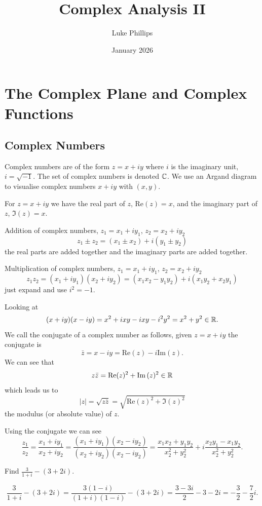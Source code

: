 \documentclass[10pt, a4paper]{article}
\title{Complex Analysis II}
\author{Luke Phillips}
\date{January 2026}
\begin{document}
\maketitle

\newpage

\tableofcontents

\newpage

\section{The Complex Plane and Complex Functions}

\subsection{Complex Numbers}

Complex numbers are of the form $z = x + iy$ where $i$ is the imaginary unit,
$i = \sqrt{-1}$.
The set of complex numbers is denoted $\mathbb{C}$.
We use an Argand diagram to visualise complex numbers $x + iy$ with $(x, y)$.

For $z = x + iy$ we have the real part of $z$,
$\mathrm{Re}(z) = x$,
and the imaginary part of $z$,
$\Im(z) = x$.

Addition of complex numbers,
$z_1 = x_1 + iy_1$,
$z_2 = x_2 + iy_2$
\[
z_1 \pm z_2 = (x_1 \pm x_2) + i(y_1 \pm y_2)
\]
the real parts are added together and the imaginary parts are added together.

Multiplication of complex numbers,
$z_1 = x_1 + iy_1$,
$z_2 = x_2 + iy_2$
\[
z_1z_2 = (x_1 + iy_1)(x_2 + iy_2) = (x_1x_2 - y_1y_2) + i(x_1y_2 + x_2y_1)
\]
just expand and use $i ^ 2 = -1$.

Looking at
\[
(x + iy)(x - iy) = x ^ 2 + ixy - ixy - i ^ 2y ^ 2 = x ^ 2 + y ^ 2 \in \mathbb{R}.
\]
We call the conjugate of a complex number as follows,
given $z = x + iy$ the conjugate is
\[
\bar{z} = x - iy = \mathrm{Re}(z) - i\mathrm{Im}(z).
\]
We can see that
\[
z\bar{z} = \mathrm{Re}(z) ^ 2 + \mathrm{Im}\,(z) ^ 2 \in \mathbb{R}
\]
which leads us to
\[
|z| = \sqrt{z\bar{z}} = \sqrt{\mathrm{Re}(z) ^ 2 + \Im(z) ^ 2}
\]
the modulus
(or absolute value)
of $z$.

Using the conjugate we can see
\[
\frac{z_1}{z_2} = \frac{x_1 + iy_1}{x_2 + iy_2} = \frac{(x_1 + iy_1)(x_2 - iy_2)}{(x_2 + iy_2)(x_2 - iy_2)} = \frac{x_1x_2 + y_1y_2}{x_2 ^ 2 + y_2 ^ 2} + i\frac{x_2y_1 - x_1y_2}{x_2 ^ 2 + y_2 ^ 2}.
\]

\begin{example}
    Find $\frac{3}{1 + i} - (3 + 2i)$.

    \begin{solution}
        \[
        \frac{3}{1 + i} - (3 + 2i) = \frac{3(1 - i)}{(1 + i)(1 - i)} - (3 + 2i) = \frac{3 - 3i}{2} - 3 - 2i = -\frac{3}{2} - \frac{7}{2}i.
        \]
    \end{solution}
\end{example}
\end{document}

